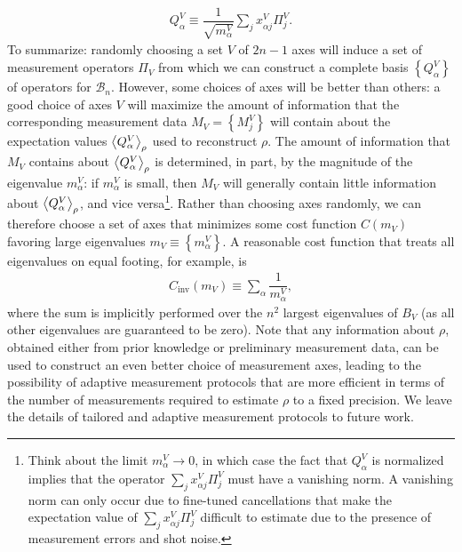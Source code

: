 \documentclass[nofootinbib,notitlepage,11pt]{revtex4-2}
\renewcommand{\t}{\text} %
\newcommand{\f}[2]{\dfrac{#1}{#2}} %
\newcommand{\p}[1]{\left(#1\right)} %
\renewcommand{\set}[1]{\left\{#1\right\}} %
\newcommand{\bk}{\Braket} %
\newcommand{\1}{\mathds{1}}
\newcommand{\B}{\mathcal{B}}
\begin{document}
\begin{align}
  Q^V_\alpha \equiv \f1{\sqrt{m^V_\alpha}} \sum_j x^V_{\alpha j} \Pi^V_j.
\end{align}
To summarize: randomly choosing a set $V$ of $2n-1$ axes will induce a set of measurement operators $\Pi_V$ from which we can construct a complete basis $\set{Q^V_\alpha}$ of operators for $\B_n$.
However, some choices of axes will be better than others: a good choice of axes $V$ will maximize the amount of information that the corresponding measurement data $M_V=\set{M^V_j}$ will contain about the expectation values $\bk{Q^V_\alpha}_\rho$ used to reconstruct $\rho$.
The amount of information that $M_V$ contains about $\bk{Q^V_\alpha}_\rho$ is determined, in part, by the magnitude of the eigenvalue $m^V_\alpha$: if $m^V_\alpha$ is small, then $M_V$ will generally contain little information about $\bk{Q^V_\alpha}_\rho$, and vice versa\footnote{Think about the limit $m^V_\alpha\to0$, in which case the fact that $Q^V_\alpha$ is normalized implies that the operator $\sum_j x^V_{\alpha j} \Pi^V_j$ must have a vanishing norm.
  A vanishing norm can only occur due to fine-tuned cancellations that make the expectation value of $\sum_j x^V_{\alpha j} \Pi^V_j$ difficult to estimate due to the presence of measurement errors and shot noise.}.
Rather than choosing axes randomly, we can therefore choose a set of axes that minimizes some cost function $C\p{m_V}$ favoring large eigenvalues $m_V\equiv\set{m^V_\alpha}$.
A reasonable cost function that treats all eigenvalues on equal footing, for example, is
\begin{align}
  C_{\t{inv}}\p{m_V} \equiv \sum_\alpha \f1{m^V_\alpha},
\end{align}
where the sum is implicitly performed over the $n^2$ largest eigenvalues of $B_V$ (as all other eigenvalues are guaranteed to be zero).
Note that any information about $\rho$, obtained either from prior knowledge or preliminary measurement data, can be used to construct an even better choice of measurement axes, leading to the possibility of adaptive measurement protocols \cite{pereira2018adaptive} that are more efficient in terms of the number of measurements required to estimate $\rho$ to a fixed precision.
We leave the details of tailored and adaptive measurement protocols to future work.


\end{document}
